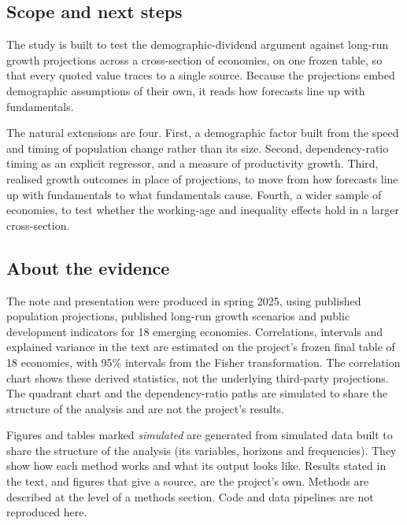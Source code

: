 \documentclass[
  british,
  a4paper,
]{article}
\begin{document}
\subsection{Scope and next steps}\label{scope-and-next-steps}

The study is built to test the demographic-dividend argument against
long-run growth projections across a cross-section of economies, on one
frozen table, so that every quoted value traces to a single source.
Because the projections embed demographic assumptions of their own, it
reads how forecasts line up with fundamentals.

The natural extensions are four. First, a demographic factor built from
the speed and timing of population change rather than its size. Second,
dependency-ratio timing as an explicit regressor, and a measure of
productivity growth. Third, realised growth outcomes in place of
projections, to move from how forecasts line up with fundamentals to
what fundamentals cause. Fourth, a wider sample of economies, to test
whether the working-age and inequality effects hold in a larger
cross-section.

\subsection{About the evidence}\label{about-the-evidence}

The note and presentation were produced in spring 2025, using published
population projections, published long-run growth scenarios and public
development indicators for 18 emerging economies. Correlations,
intervals and explained variance in the text are estimated on the
project's frozen final table of 18 economies, with 95\% intervals from
the Fisher transformation. The correlation chart shows these derived
statistics, not the underlying third-party projections. The quadrant
chart and the dependency-ratio paths are simulated to share the
structure of the analysis and are not the project's results.

Figures and tables marked \emph{simulated} are generated from simulated
data built to share the structure of the analysis (its variables,
horizons and frequencies). They show how each method works and what its
output looks like. Results stated in the text, and figures that give a
source, are the project's own. Methods are described at the level of a
methods section. Code and data pipelines are not reproduced here.
\end{document}
